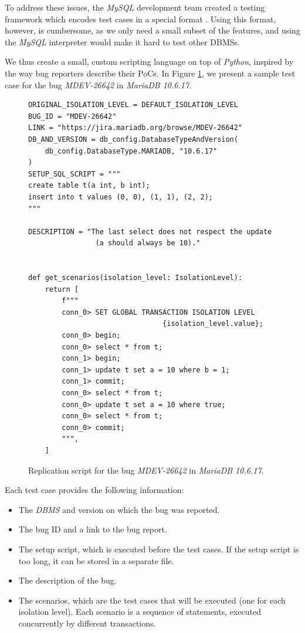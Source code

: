 To address these issues, the \textit{MySQL} development team created a testing framework which encodes test cases in a special format \cite{mysqltestrun}. Using this format, however, is cumbersome, as we only need a small subset of the features, and using the \textit{MySQL} interpreter would make it hard to test other DBMSs. 

We thus create a small, custom scripting language on top of \textit{Python}, inspired by the way bug reporters describe their PoCs. In Figure \ref{fig:bug_metalanguage_sample}, we present a sample test case for the bug \textit{MDEV-26642} in \textit{MariaDB 10.6.17}.

\begin{figure}
\begin{verbatim}
ORIGINAL_ISOLATION_LEVEL = DEFAULT_ISOLATION_LEVEL
BUG_ID = "MDEV-26642"
LINK = "https://jira.mariadb.org/browse/MDEV-26642"
DB_AND_VERSION = db_config.DatabaseTypeAndVersion(
    db_config.DatabaseType.MARIADB, "10.6.17"
)
SETUP_SQL_SCRIPT = """
create table t(a int, b int);
insert into t values (0, 0), (1, 1), (2, 2);
"""

DESCRIPTION = "The last select does not respect the update
                (a should always be 10)."


def get_scenarios(isolation_level: IsolationLevel):
    return [
        f"""
        conn_0> SET GLOBAL TRANSACTION ISOLATION LEVEL
                                {isolation_level.value};
        conn_0> begin;
        conn_0> select * from t;
        conn_1> begin;
        conn_1> update t set a = 10 where b = 1;
        conn_1> commit;
        conn_0> select * from t;
        conn_0> update t set a = 10 where true;
        conn_0> select * from t;
        conn_0> commit;
        """,
    ]
\end{verbatim}
\caption{Replication script for the bug \textit{MDEV-26642} in \textit{MariaDB 10.6.17}.} \label{fig:bug_metalanguage_sample}
\end{figure}

Each test case provides the following information:
\begin{itemize}
    \item The \textit{DBMS} and version on which the bug was reported.
    \item The bug ID and a link to the bug report.
    \item The setup script, which is executed before the test cases. If the setup script is too long, it can be stored in a separate file.
    \item The description of the bug.
    \item The scenarios, which are the test cases that will be executed (one for each isolation level). Each scenario is a sequence of statements, executed concurrently by different transactions.
\end{itemize}

